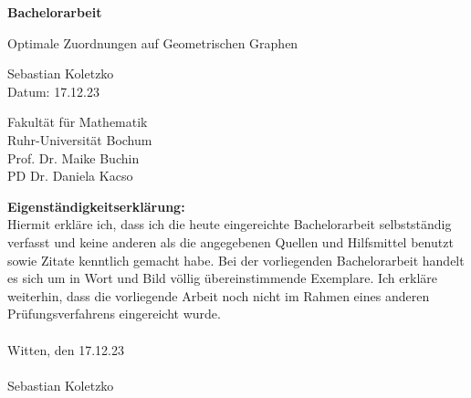 \documentclass[a4paper, 12pt, twoside]{article}
\theoremstyle{Format1} %
\begin{document}
\newgeometry{} %
\begin{titlepage}
	\begin{center}
		\vspace*{1cm}

		\Huge
		\textbf{Bachelorarbeit}

		\vspace{0.5cm}
		\LARGE
		Optimale Zuordnungen auf Geometrischen Graphen

		\vspace{1.5cm}
		\large Sebastian Koletzko\\

		\vspace{1cm}
		Datum: 17.12.23

		\vfill

		\vspace{5cm}


		\large
		Fakultät für Mathematik
		\\
		Ruhr-Universität Bochum
		\\
		\vspace{0.5cm}
		Prof. Dr. Maike Buchin
		\\
		PD Dr. Daniela Kacso

	\end{center}
\end{titlepage}

\restoregeometry %

\newpage\null\thispagestyle{empty}\newpage %

\thispagestyle{empty} %

\textbf{Eigenständigkeitserklärung:}
\\
Hiermit erkläre ich, dass ich die heute eingereichte Bachelorarbeit selbstständig verfasst und keine anderen als die angegebenen Quellen und Hilfsmittel benutzt sowie Zitate kenntlich gemacht habe.
Bei der vorliegenden Bachelorarbeit handelt es sich um in Wort und Bild völlig übereinstimmende Exemplare. Ich erkläre weiterhin, dass die vorliegende Arbeit noch nicht im Rahmen eines anderen Prüfungsverfahrens eingereicht wurde.
\\
\\
Witten, den 17.12.23
\\
\\
Sebastian Koletzko
\end{document}
